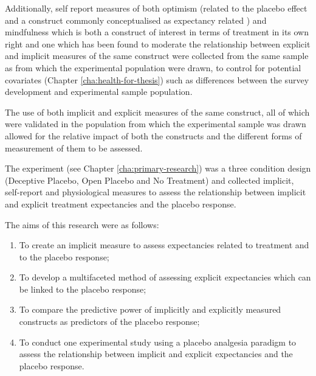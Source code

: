 Additionally, self report measures of both optimism (related to the placebo effect and a construct commonly conceptualised as expectancy related \cite{Carver2010}) and mindfulness which is both a construct of interest in terms of treatment in its own right \cite{kabat1982outpatient} and one which has been found to moderate the relationship between explicit and implicit measures of the same construct were collected from the same sample as from which the experimental population were drawn, to control for potential covariates (Chapter \ref{cha:health-for-thesis}) such as differences between the survey development and experimental sample population. 

The use of both implicit and explicit measures of the same construct, all of which were validated in the population from which the experimental sample was drawn allowed for the relative impact of both the constructs and the different forms of measurement of them to be assessed. 

The experiment (see Chapter \ref{cha:primary-research}) was a three condition design (Deceptive Placebo, Open Placebo and No Treatment) and collected implicit, self-report and physiological measures to assess the relationship between implicit and explicit treatment expectancies and the placebo response. 







The aims of this research were as follows:


\begin{enumerate}


\item To create an implicit measure to assess expectancies related to treatment and to the placebo response;

\item To develop a multifaceted method of assessing explicit expectancies which can be linked to the placebo response;

\item To compare the predictive power of implicitly and explicitly measured constructs as predictors of the placebo response;

\item To conduct one  experimental study using a placebo analgesia paradigm to assess the relationship between implicit and explicit expectancies and the placebo response.
\end{enumerate}

